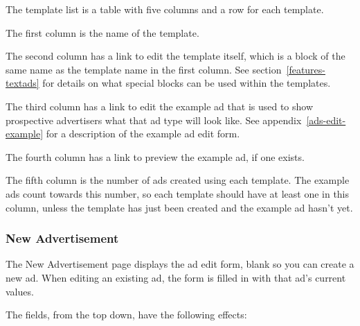 The template list is a table with five columns and a row for each template.

The first column is the name of the template.

The second column has a link to edit the template itself, which is a block of the same name as the template name in the first column.  See section~\ref{features-textads} for details on what special blocks can be used within the templates.

The third column has a link to edit the example ad that is used to show prospective advertisers what that ad type will look like.  See appendix~\ref{ads-edit-example} for a description of the example ad edit form.

The fourth column has a link to preview the example ad, if one exists.

The fifth column is the number of ads created using each template.  The example ads count towards this number, so each template should have at least one in this column, unless the template has just been created and the example ad hasn't yet.

\subsubsection{New Advertisement}
\label{ads-new-ad}

The New Advertisement page displays the ad edit form, blank so you can create a new ad.  When editing an existing ad, the form is filled in with that ad's current values.

The fields, from the top down, have the following effects:

